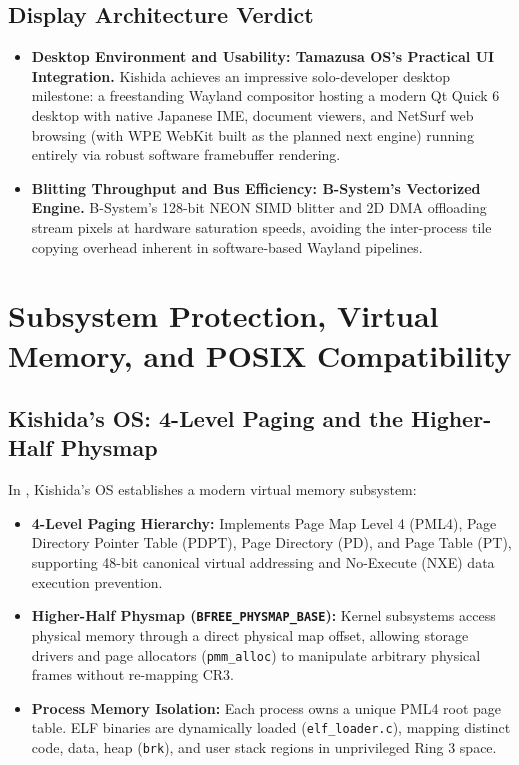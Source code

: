 \documentclass[10pt,journal,compsoc,twocolumn]{article}
\begin{document}
\subsection{Display Architecture Verdict}
\begin{itemize}[leftmargin=*]
    \item \textbf{Desktop Environment and Usability: Tamazusa OS's Practical UI Integration.} Kishida achieves an impressive solo-developer desktop milestone: a freestanding Wayland compositor hosting a modern Qt Quick 6 desktop with native Japanese IME, document viewers, and NetSurf web browsing (with WPE WebKit built as the planned next engine) running entirely via robust software framebuffer rendering.
    \item \textbf{Blitting Throughput and Bus Efficiency: B-System's Vectorized Engine.} B-System's 128-bit NEON SIMD blitter and 2D DMA offloading stream pixels at hardware saturation speeds, avoiding the inter-process tile copying overhead inherent in software-based Wayland pipelines.
\end{itemize}

\section{Subsystem Protection, Virtual Memory, and POSIX Compatibility}
\label{sec:mmu}

\subsection{Kishida's OS: 4-Level Paging and the Higher-Half Physmap}
In , Kishida's OS establishes a modern virtual memory subsystem:
\begin{itemize}[leftmargin=*]
    \item \textbf{4-Level Paging Hierarchy:} Implements Page Map Level 4 (PML4), Page Directory Pointer Table (PDPT), Page Directory (PD), and Page Table (PT), supporting 48-bit canonical virtual addressing and No-Execute (NXE) data execution prevention.
    \item \textbf{Higher-Half Physmap (\texttt{BFREE\_PHYSMAP\_BASE}):} Kernel subsystems access physical memory through a direct physical map offset, allowing storage drivers and page allocators (\texttt{pmm\_alloc}) to manipulate arbitrary physical frames without re-mapping CR3.
    \item \textbf{Process Memory Isolation:} Each process owns a unique PML4 root page table. ELF binaries are dynamically loaded (\texttt{elf\_loader.c}), mapping distinct code, data, heap (\texttt{brk}), and user stack regions in unprivileged Ring 3 space.
\end{itemize}
\end{document}
